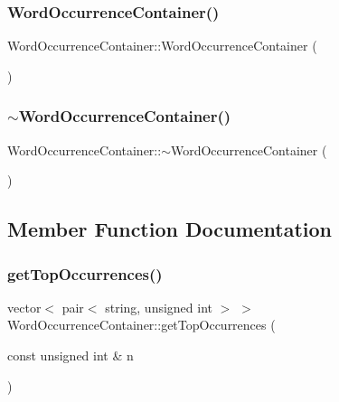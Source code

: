 \subsubsection{\texorpdfstring{Word\+Occurrence\+Container()}{WordOccurrenceContainer()}}
{\footnotesize\ttfamily Word\+Occurrence\+Container\+::\+Word\+Occurrence\+Container (\begin{DoxyParamCaption}{ }\end{DoxyParamCaption})}

\mbox{\label{class_word_occurrence_container_a96a671f07750218a9325a8cab89288ef}} 
\subsubsection{\texorpdfstring{$\sim$\+Word\+Occurrence\+Container()}{~WordOccurrenceContainer()}}
{\footnotesize\ttfamily Word\+Occurrence\+Container\+::$\sim$\+Word\+Occurrence\+Container (\begin{DoxyParamCaption}{ }\end{DoxyParamCaption})}



\subsection{Member Function Documentation}
\mbox{\label{class_word_occurrence_container_aa4402285c14c3d282aa34c62934260e1}} 
\subsubsection{\texorpdfstring{get\+Top\+Occurrences()}{getTopOccurrences()}}
{\footnotesize\ttfamily vector$<$ pair$<$ string, unsigned int $>$ $>$ Word\+Occurrence\+Container\+::get\+Top\+Occurrences (\begin{DoxyParamCaption}\item[{const unsigned int \&}]{n }\end{DoxyParamCaption})}



